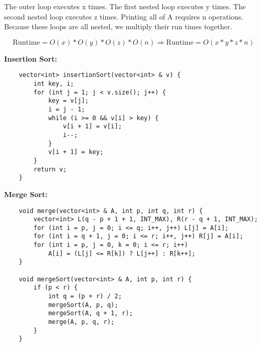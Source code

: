 \documentclass[8pt, a4paper]{article}
\begin{document}
\begin{enumerate}
  The outer loop executes x times. The first nested loop executes y times. 
  The second nested loop executes z times. Printing all of A requires n operations.
  Because these loops are all nested, we multiply their run times together. 

    \[
      \textrm{Runtime} = O(x) * O(y) * O(z) * O(n) \Rightarrow \textrm{Runtime} = O(x * y * z * n)
    \]

  \textbf{Insertion Sort: }
  \begin{lstlisting}
    vector<int> insertionSort(vector<int> & v) {
        int key, i;
        for (int j = 1; j < v.size(); j++) {
            key = v[j];
            i = j - 1;
            while (i >= 0 && v[i] > key) {
                v[i + 1] = v[i];
                i--;
            }
            v[i + 1] = key;
        }
        return v;
    }
  \end{lstlisting}

  \textbf{Merge Sort:}

  \begin{lstlisting}
    void merge(vector<int> & A, int p, int q, int r) {
        vector<int> L(q - p + 1 + 1, INT_MAX), R(r - q + 1, INT_MAX);
        for (int i = p, j = 0; i <= q; i++, j++) L[j] = A[i];
        for (int i = q + 1, j = 0; i <= r; i++, j++) R[j] = A[i];
        for (int i = p, j = 0, k = 0; i <= r; i++)
            A[i] = (L[j] <= R[k]) ? L[j++] : R[k++];
    }
    
    void mergeSort(vector<int> & A, int p, int r) {
        if (p < r) {
            int q = (p + r) / 2;
            mergeSort(A, p, q);
            mergeSort(A, q + 1, r);
            merge(A, p, q, r);
        }
    }
  \end{lstlisting}

  
  


\end{enumerate}
\end{document}
